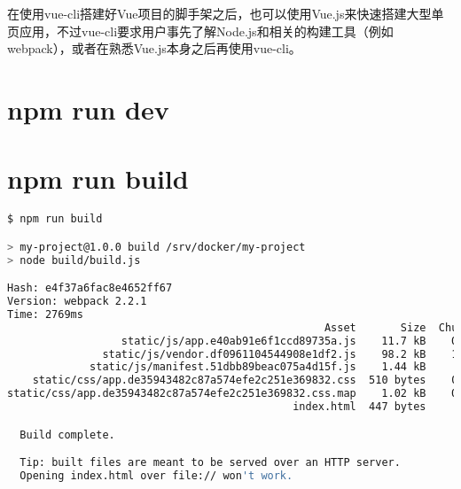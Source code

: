 在使用vue-cli搭建好Vue项目的脚手架之后，也可以使用Vue.js来快速搭建大型单页应用，不过vue-cli要求用户事先了解Node.js和相关的构建工具（例如webpack），或者在熟悉Vue.js本身之后再使用vue-cli。


\section{npm run dev}



\section{npm run build}


\begin{lstlisting}[language=bash]
$ npm run build

> my-project@1.0.0 build /srv/docker/my-project
> node build/build.js

Hash: e4f37a6fac8e4652ff67
Version: webpack 2.2.1
Time: 2769ms
                                                  Asset       Size  Chunks             Chunk Names
                  static/js/app.e40ab91e6f1ccd89735a.js    11.7 kB    0, 2  [emitted]  app
               static/js/vendor.df0961104544908e1df2.js    98.2 kB    1, 2  [emitted]  vendor
             static/js/manifest.51dbb89beac075a4d15f.js    1.44 kB       2  [emitted]  manifest
    static/css/app.de35943482c87a574efe2c251e369832.css  510 bytes    0, 2  [emitted]  app
static/css/app.de35943482c87a574efe2c251e369832.css.map    1.02 kB    0, 2  [emitted]  app
                                             index.html  447 bytes          [emitted]  

  Build complete.

  Tip: built files are meant to be served over an HTTP server.
  Opening index.html over file:// won't work.
\end{lstlisting}

